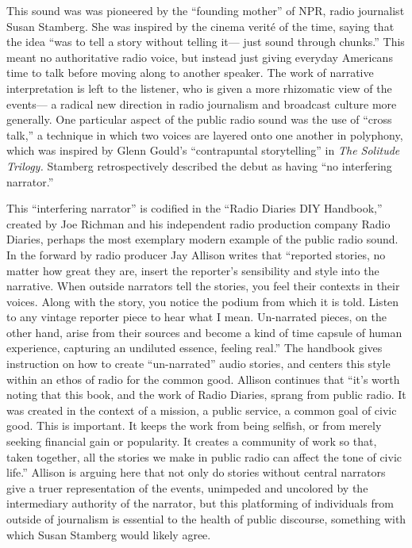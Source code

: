 \documentclass[12pt,letterpaper]{article}
\begin{document}
	This sound was was pioneered by the ``founding mother'' of NPR, radio 
	journalist Susan Stamberg. She was inspired by the cinema verité of the
	time, saying that the idea ``was to tell a story without telling it---
	just sound through chunks.'' This meant no authoritative radio voice,
	but instead just giving everyday Americans time to talk before moving 
	along to another speaker. The work of narrative interpretation is left
	to the listener, who is given a more rhizomatic view of the events---
	a radical new direction in radio journalism and broadcast culture more
	generally.  One particular aspect of the public radio sound was the use
	of ``cross
	talk,'' a technique in which two voices are layered onto one another 	
	in polyphony, which was inspired by Glenn Gould's ``contrapuntal 
	storytelling'' in \textit{The Solitude Trilogy.}\autocite[197]{Porter}
	Stamberg retrospectively described the debut as having ``no interfering 
	narrator.''\autocite[185]{Porter}

	This ``interfering narrator'' is codified in the ``Radio Diaries DIY
	Handbook,'' created by Joe Richman and his independent radio production
	company Radio Diaries, perhaps the most exemplary modern example of the 	public radio sound. In the forward by radio producer Jay Allison writes 	that ``reported stories, no matter how great they are, 
	insert the reporter’s sensibility and style into the narrative. When 
	outside narrators tell the stories, you feel their contexts in their 
	voices. Along with the story, you notice the podium from which it is 
	told. Listen to any vintage reporter piece to hear what I mean. 
	Un-narrated pieces, on the other hand, arise from their sources and 
	become a kind of time capsule of human experience, capturing an 
	undiluted essence, feeling real.'' The handbook gives instruction on how
	to create ``un-narrated'' audio stories, and centers this style within
	an ethos of radio for the common good. Allison continues that ``it's 
	worth noting that this book, and the work of 
	Radio Diaries, sprang from public radio. It was created in the context 
	of a mission, a public service, a common goal of civic good. This is 
	important. It keeps the work from being selfish, or from merely seeking
	financial gain or popularity. It creates a community of work so that, 
	taken together, all the stories we make in public radio can affect the 
	tone of civic life.'' Allison is arguing here that not only do
	stories without central narrators give a truer representation of the 
	events, unimpeded and uncolored by the intermediary authority of the
	narrator, but this platforming of individuals from outside of journalism
	is essential to the health of public discourse, something with which
	Susan Stamberg would likely agree.  
	
\end{document}
